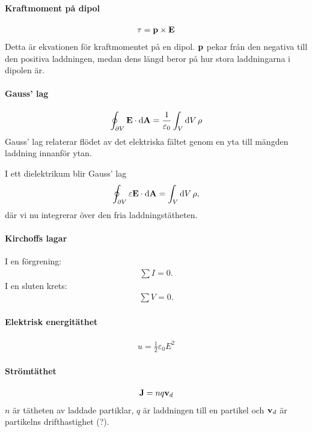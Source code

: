 \paragraph{Kraftmoment på dipol}
\begin{align*}
	\vect{\tau} = \vect{p}\times\vect{E}
\end{align*}
Detta är ekvationen för kraftmomentet på en dipol. $\vect{p}$ pekar från den negativa till den positiva laddningen, medan dens längd beror på hur stora laddningarna i dipolen är.

\deriv

\paragraph{Gauss' lag}
\begin{align*}
	\oint_{\partial V}\vect{E}\cdot\dd{\vect{A}} = \frac{1}{\varepsilon_0}\int_{V}\dd{V}\rho
\end{align*}
Gauss' lag relaterar flödet av det elektriska fältet genom en yta till mängden laddning innanför ytan.

I ett dielektrikum blir Gauss' lag
\begin{align*}
	\oint_{\partial V}\varepsilon\vect{E}\cdot\dd{\vect{A}} = \int_{V}\dd{V}\rho,
\end{align*}
där vi nu integrerar över den fria laddningstätheten.

\deriv

\paragraph{Kirchoffs lagar}
I en förgrening:
\begin{align*}
	\sum I = 0.
\end{align*}
I en sluten krets:
\begin{align*}
	\sum V = 0.
\end{align*}

\deriv

\paragraph{Elektrisk energitäthet}
\begin{align*}
	u = \frac{1}{2}\varepsilon_0E^2
\end{align*}

\deriv

\paragraph{Strömtäthet}
\begin{align*}
	\vect{J} = nq\vect{v}_d
\end{align*}
$n$ är tätheten av laddade partiklar, $q$ är laddningen till en partikel och $\vect{v}_d$ är partikelns drifthastighet (?).

